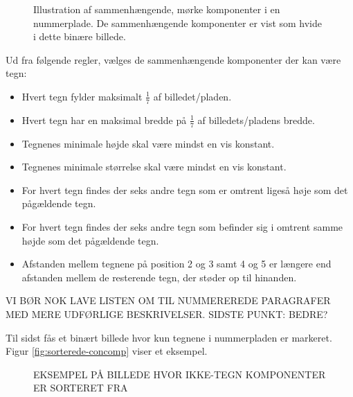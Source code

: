 \begin{figure}[htp]
  \centering
  \caption{Illustration af sammenhængende, mørke komponenter i en nummerplade. De sammenhængende komponenter er vist som hvide i dette binære billede.}
  \label{fig:concomp}
\end{figure}

Ud fra følgende regler, vælges de sammenhængende komponenter der kan være tegn:

\begin{itemize}
\item Hvert tegn fylder maksimalt $\frac{1}{7}$ af billedet/pladen.
\item Hvert tegn har en maksimal bredde på $\frac{1}{7}$ af billedets/pladens bredde.
\item Tegnenes minimale højde skal være mindst en vis konstant.%
\item Tegnenes minimale størrelse skal være mindst en vis konstant.%
\item For hvert tegn findes der seks andre tegn som er omtrent ligeså høje som det pågældende tegn.
\item For hvert tegn findes der seks andre tegn som befinder sig i omtrent samme højde som det pågældende tegn.
\item Afstanden mellem tegnene på position 2 og 3 samt 4 og 5 er længere end afstanden mellem de resterende tegn, der støder op til hinanden.
\end{itemize}
VI BØR NOK LAVE LISTEN OM TIL NUMMEREREDE PARAGRAFER MED MERE UDFØRLIGE BESKRIVELSER.
SIDSTE PUNKT: BEDRE?


Til sidst fås et binært billede hvor kun tegnene i nummerpladen er markeret. Figur \vref{fig:sorterede-concomp} viser et eksempel.

\begin{figure}[htp]
  \centering
  \caption{EKSEMPEL PÅ BILLEDE HVOR IKKE-TEGN KOMPONENTER ER SORTERET FRA}
  \label{fig:sorterede-concomp}
\end{figure}

